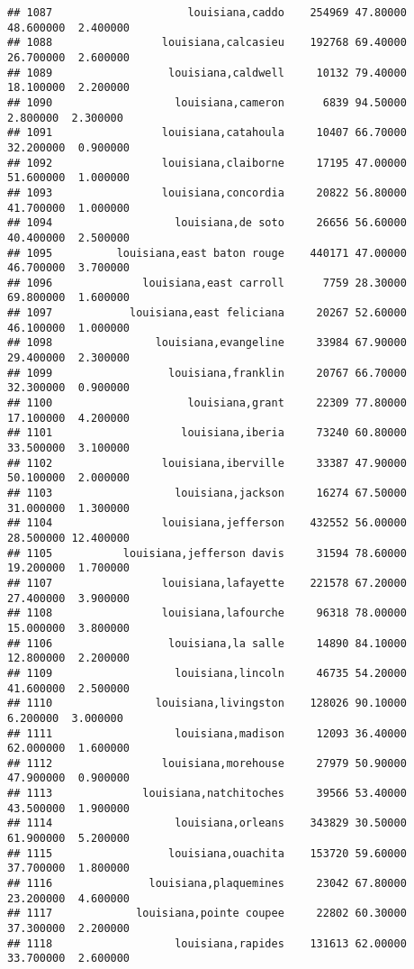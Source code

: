 \documentclass[
]{article}
\begin{document}
\begin{verbatim}
## 1087                     louisiana,caddo    254969 47.80000 48.600000  2.400000
## 1088                 louisiana,calcasieu    192768 69.40000 26.700000  2.600000
## 1089                  louisiana,caldwell     10132 79.40000 18.100000  2.200000
## 1090                   louisiana,cameron      6839 94.50000  2.800000  2.300000
## 1091                 louisiana,catahoula     10407 66.70000 32.200000  0.900000
## 1092                 louisiana,claiborne     17195 47.00000 51.600000  1.000000
## 1093                 louisiana,concordia     20822 56.80000 41.700000  1.000000
## 1094                   louisiana,de soto     26656 56.60000 40.400000  2.500000
## 1095          louisiana,east baton rouge    440171 47.00000 46.700000  3.700000
## 1096              louisiana,east carroll      7759 28.30000 69.800000  1.600000
## 1097            louisiana,east feliciana     20267 52.60000 46.100000  1.000000
## 1098                louisiana,evangeline     33984 67.90000 29.400000  2.300000
## 1099                  louisiana,franklin     20767 66.70000 32.300000  0.900000
## 1100                     louisiana,grant     22309 77.80000 17.100000  4.200000
## 1101                    louisiana,iberia     73240 60.80000 33.500000  3.100000
## 1102                 louisiana,iberville     33387 47.90000 50.100000  2.000000
## 1103                   louisiana,jackson     16274 67.50000 31.000000  1.300000
## 1104                 louisiana,jefferson    432552 56.00000 28.500000 12.400000
## 1105           louisiana,jefferson davis     31594 78.60000 19.200000  1.700000
## 1107                 louisiana,lafayette    221578 67.20000 27.400000  3.900000
## 1108                 louisiana,lafourche     96318 78.00000 15.000000  3.800000
## 1106                  louisiana,la salle     14890 84.10000 12.800000  2.200000
## 1109                   louisiana,lincoln     46735 54.20000 41.600000  2.500000
## 1110                louisiana,livingston    128026 90.10000  6.200000  3.000000
## 1111                   louisiana,madison     12093 36.40000 62.000000  1.600000
## 1112                 louisiana,morehouse     27979 50.90000 47.900000  0.900000
## 1113              louisiana,natchitoches     39566 53.40000 43.500000  1.900000
## 1114                   louisiana,orleans    343829 30.50000 61.900000  5.200000
## 1115                  louisiana,ouachita    153720 59.60000 37.700000  1.800000
## 1116               louisiana,plaquemines     23042 67.80000 23.200000  4.600000
## 1117             louisiana,pointe coupee     22802 60.30000 37.300000  2.200000
## 1118                   louisiana,rapides    131613 62.00000 33.700000  2.600000

\end{verbatim}
\end{document}
